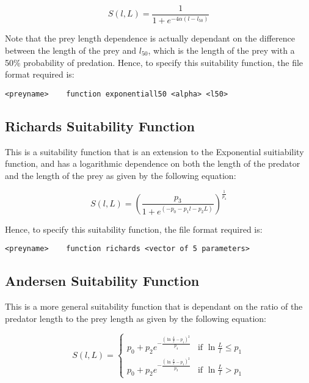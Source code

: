 \documentclass[10pt,twoside]{book}
\begin{document}
\begin{equation}\label{eq:l50suit}
S(l, L) = { \frac{1}{1 + e^{ -4 \alpha (l - l_{50})}}}
\end{equation}

Note that the prey length dependence is actually dependant on the difference between the length of the prey and $l_{50}$, which is the length of the prey with a 50\% probability of predation.  Hence, to specify this suitability function, the file format required is:

{\small\begin{verbatim}
<preyname>    function exponentiall50 <alpha> <l50>
\end{verbatim}}

\subsection{Richards Suitability Function}
This is a suitability function that is an extension to the Exponential suitiability function, and has a logarithmic dependence on both the length of the predator and the length of the prey as given by the following equation:

\begin{equation}\label{eq:richsuit}
S(l, L) = \left({\frac{p_3}{1 + e^{(- p_0 - p_1 l - p_2  L)}}}\right) ^ {\frac{1}{p_4}}
\end{equation}

Hence, to specify this suitability function, the file format required is:

{\small\begin{verbatim}
<preyname>    function richards <vector of 5 parameters>
\end{verbatim}}

\subsection{Andersen Suitability Function}
This is a more general suitability function that is dependant on the ratio of the predator length to the prey length as given by the following equation:

\begin{equation}\label{eq:andersensuit}
S(l, L) =
\begin{cases}
p_0 + p_2e^{-\frac{(\ln\frac{L}{l} - p_1)^2}{p_4}} & \textrm{if $\ln\frac{L}{l} \leq p_1$} \\
p_0 + p_2e^{-\frac{(\ln\frac{L}{l} - p_1)^2}{p_3}} & \textrm{if $\ln\frac{L}{l} > p_1$}
\end{cases}
\end{equation}
\end{document}
